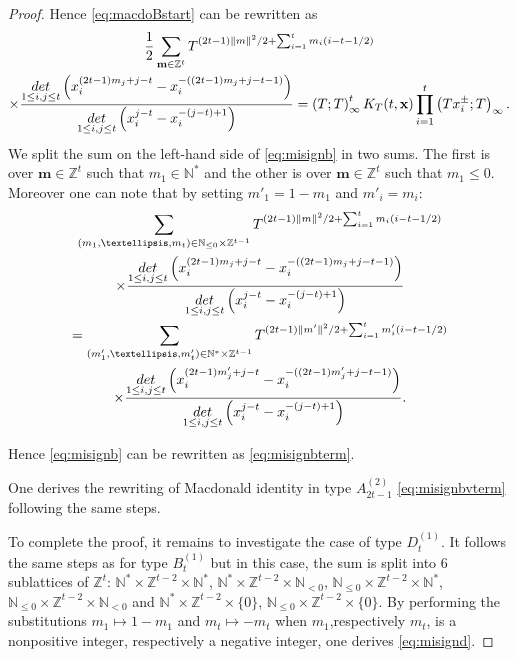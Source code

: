 \documentclass[11pt,letterpaper]{amsart}
\def\bbbz{\mathbb Z}
\def\bbbn{\mathbb N}
\def\det{{\rm det}}
\numberwithin{equation}{section}
\numberwithin{df}{section}
\begin{document}
\begin{proof}
Hence \eqref{eq:macdoBstart} can be rewritten as
\begin{multline}
\frac{1}{2}\sum_{\mathbf{m}\in\bbbz^t}T^{(2t-1)\lVert m\rVert^2/2+\sum_{i=1}^tm_i(i-t-1/2)}\\
\times\frac{\underset{1\le i,j\le t}{\det}\left(x_i^{(2t-1)m_j+j-t}-x_i^{-((2t-1)m_j+j-t-1)}\right)}{\underset{1\le i,j\le t}{\det}\left(x_i^{j-t}-x_i^{-(j-t)+1}\right)}
=\left(T;T\right)_\infty^{t} K_T(t,\mathbf{x})\prod_{i=1}^t \left(Tx_i^{\pm};T\right)_\infty .\label{eq:misignb}
\end{multline}
We split the sum on the left-hand side of \eqref{eq:misignb} in two sums. The first is over $\mathbf{m}\in\bbbz^t$ such that $m_1\in\bbbn^*$ and the other is over $\mathbf{m}\in\bbbz^t$ such that $m_1\leq 0$. Moreover one can note that by setting $m'_1=1-m_1$ and $m'_i=m_i$:
\begin{multline*}
\sum_{(m_1,\dots,m_t)\in\mathbb{N}_{\leq 0}\times\bbbz^{t-1}}T^{(2t-1)\lVert m\rVert^2/2+\sum_{i=1}^tm_i(i-t-1/2)}\\\times\frac{\underset{1\le i,j\le t}{\det}\left(x_i^{(2t-1)m_j+j-t}-x_i^{-((2t-1)m_j+j-t-1)}\right)}{\underset{1\le i,j\le t}{\det}\left(x_i^{j-t}-x_i^{-(j-t)+1}\right)}
\\=\sum_{(m'_1,\dots,m'_t)\in\mathbb{N}^*\times\bbbz^{t-1}}T^{(2t-1)\lVert m'\rVert^2/2+\sum_{i=1}^tm'_i(i-t-1/2)}
\\\times \frac{\underset{1\le i,j\le t}{\det}\left(x_i^{(2t-1)m'_j+j-t}-x_i^{-((2t-1)m'_j+j-t-1)}\right)}{\underset{1\le i,j\le t}{\det}\left(x_i^{j-t}-x_i^{-(j-t)+1}\right)}.
\end{multline*}
%

\noindent Hence \eqref{eq:misignb} can be rewritten as \eqref{eq:misignbterm}.

\noindent One derives the rewriting of Macdonald identity in type $A_{2t-1}^{(2)}$ \eqref{eq:misignbvterm} following the same steps.

\noindent To complete the proof, it remains to investigate the case of type $D_t^{(1)}$. It follows the same steps as for type $B_t^{(1)}$ but in this case, the sum is split into $6$ sublattices of $\mathbb{Z}^t$: $\bbbn^*\times \bbbz^{t-2}\times \bbbn^*$, $\bbbn^*\times \bbbz^{t-2}\times \bbbn_{<0}$, $\bbbn_{\leq 0}\times \bbbz^{t-2}\times \bbbn^*$, $\bbbn_{\leq 0}\times \bbbz^{t-2}\times \bbbn_{<0}$ and 
$\bbbn^*\times \bbbz^{t-2}\times \lbrace 0 \rbrace$, $\bbbn_{\leq 0}\times \bbbz^{t-2}\times \lbrace 0 \rbrace$.
By performing the substitutions $m_1\mapsto 1-m_1$ and $m_t\mapsto -m_t$ when $m_1$,respectively $m_t$, is a nonpositive integer, respectively a negative integer, one derives \eqref{eq:misignd}.
\end{proof}
\end{document}

